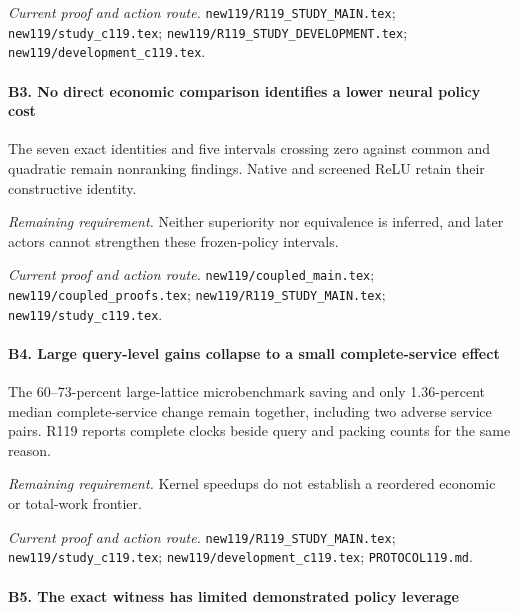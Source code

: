 \par\emph{Current proof and action route.} \nolinkurl{new119/R119_STUDY_MAIN.tex}; \nolinkurl{new119/study_c119.tex}; \nolinkurl{new119/R119_STUDY_DEVELOPMENT.tex}; \nolinkurl{new119/development_c119.tex}.

\paragraph{B3. No direct economic comparison identifies a lower neural policy cost}

The seven exact identities and five intervals crossing zero against common and quadratic remain nonranking findings. Native and screened ReLU retain their constructive identity.

\par\emph{Remaining requirement.} Neither superiority nor equivalence is inferred, and later actors cannot strengthen these frozen-policy intervals.

\par\emph{Current proof and action route.} \nolinkurl{new119/coupled_main.tex}; \nolinkurl{new119/coupled_proofs.tex}; \nolinkurl{new119/R119_STUDY_MAIN.tex}; \nolinkurl{new119/study_c119.tex}.

\paragraph{B4. Large query-level gains collapse to a small complete-service effect}

The 60--73-percent large-lattice microbenchmark saving and only 1.36-percent median complete-service change remain together, including two adverse service pairs. R119 reports complete clocks beside query and packing counts for the same reason.

\par\emph{Remaining requirement.} Kernel speedups do not establish a reordered economic or total-work frontier.

\par\emph{Current proof and action route.} \nolinkurl{new119/R119_STUDY_MAIN.tex}; \nolinkurl{new119/study_c119.tex}; \nolinkurl{new119/development_c119.tex}; \nolinkurl{PROTOCOL119.md}.

\paragraph{B5. The exact witness has limited demonstrated policy leverage}

